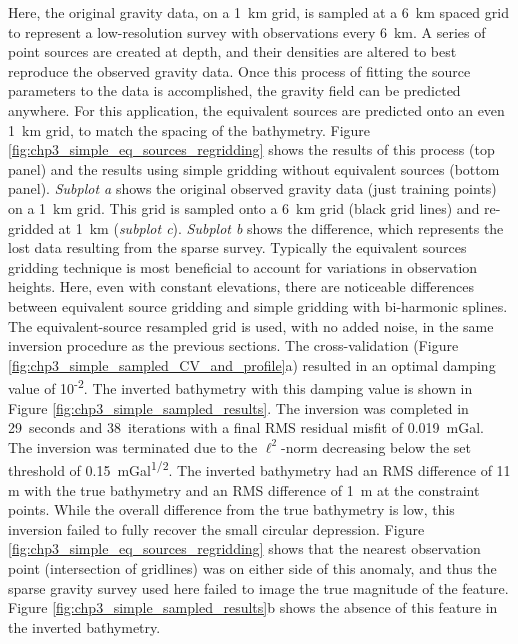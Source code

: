 Here, the original gravity data, on a 1~km grid, is sampled at a 6~km spaced grid to represent a low-resolution survey with observations every 6~km. A series of point sources are created at depth, and their densities are altered to best reproduce the observed gravity data. Once this process of fitting the source parameters to the data is accomplished, the gravity field can be predicted anywhere. For this application, the equivalent sources are predicted onto an even 1~km grid, to match the spacing of the bathymetry. Figure \ref{fig:chp3_simple_eq_sources_regridding} shows the results of this process (top panel) and the results using simple gridding without equivalent sources (bottom panel). \textit{Subplot a} shows the original observed gravity data (just training points) on a 1~km grid. This grid is sampled onto a 6~km grid (black grid lines) and re-gridded at 1~km (\textit{subplot c}). \textit{Subplot b} shows the difference, which represents the lost data resulting from the sparse survey. Typically the equivalent sources gridding technique is most beneficial to account for variations in observation heights. Here, even with constant elevations, there are noticeable differences between equivalent source gridding and simple gridding with bi-harmonic splines. \\

The equivalent-source resampled grid is used, with no added noise, in the same inversion procedure as the previous sections. The cross-validation (Figure \ref{fig:chp3_simple_sampled_CV_and_profile}a) resulted in an optimal damping value of 10\textsuperscript{-2}. The inverted bathymetry with this damping value is shown in Figure \ref{fig:chp3_simple_sampled_results}. The inversion was completed in 29~seconds and 38~iterations with a final RMS residual misfit of 0.019~mGal. The inversion was terminated due to the $\ell^2$-norm decreasing below the set threshold of 0.15~mGal\textsuperscript{1/2}. The inverted bathymetry had an RMS difference of 11 m with the true bathymetry and an RMS difference of 1~m at the constraint points. While the overall difference from the true bathymetry is low, this inversion failed to fully recover the small circular depression. Figure \ref{fig:chp3_simple_eq_sources_regridding} shows that the nearest observation point (intersection of gridlines) was on either side of this anomaly, and thus the sparse gravity survey used here failed to image the true magnitude of the feature. Figure \ref{fig:chp3_simple_sampled_results}b shows the absence of this feature in the inverted bathymetry. 

